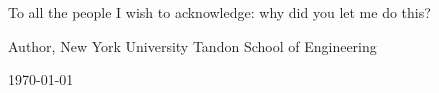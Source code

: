 \large


To all the people I wish to acknowledge: why did you let me do this?


\bigskip\medskip

\noindent \hfill Author, New York University Tandon School of Engineering

\hfill \today

